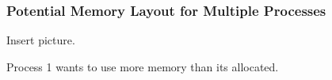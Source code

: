 \subsubsection{Potential Memory Layout for Multiple Processes}
\begin{definition}
    Insert picture.
\end{definition}

\begin{warning}
    Process 1 wants to use more memory than its allocated.
\end{warning}